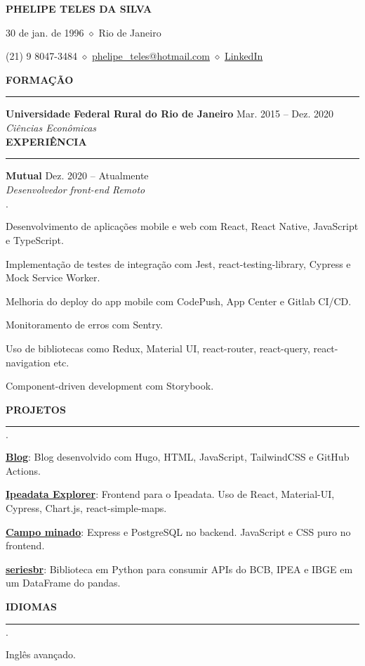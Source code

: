 \documentclass[11pt,letterpaper]{article}
\begin{document}
\centerline{\huge\bf PHELIPE TELES DA SILVA}
\medskip

\centerline{30 de jan. de 1996 $\diamond$ Rio de Janeiro}
\smallskip

\centerline{
  (21) 9 8047-3484 $\diamond$
  \href{mailto:phelipe_teles@hotmail.com}{phelipe\_teles@hotmail.com} $\diamond$ \href{https://linkedin.com/in/phelipeteles}{LinkedIn}
}
\smallskip

\medskip \textbf{FORMAÇÃO} \medskip
\hrule

\textbf{Universidade Federal Rural do Rio de Janeiro} \hfill {Mar. 2015 -- Dez. 2020} \\
\emph{Ciências Econômicas} \hfill \\

\medskip \textbf{EXPERIÊNCIA} \medskip
\hrule

\textbf{Mutual} \hfill Dez. 2020 -- Atualmente \\
\emph{Desenvolvedor front-end} \hfill \emph{Remoto} \\

\vspace*{-\baselineskip}

\begin{list}
{$\cdot$}
{
\setlength{\leftmargin}{0em}
\setlength{\itemsep}{-0.5em}
}
  \item Desenvolvimento de aplicações mobile e web com React, React Native,
    JavaScript e TypeScript.
  \item Implementação de testes de integração com Jest, react-testing-library,
    Cypress e Mock Service Worker.
  \item Melhoria do deploy do app mobile com CodePush, App Center e Gitlab CI/CD.
  \item Monitoramento de erros com Sentry.
  \item Uso de bibliotecas como Redux, Material UI, react-router, react-query,
    react-navigation etc.
  \item Component-driven development com Storybook.
\end{list}

\medskip \textbf{PROJETOS} \medskip
\hrule

\begin{list}
{$\cdot$}
{
\setlength{\leftmargin}{0em}
\setlength{\itemsep}{-0.5em}
}
 \item \href{https://phelipetls.github.io}{\textbf{Blog}}: Blog desenvolvido com
   Hugo, HTML, JavaScript, TailwindCSS e GitHub Actions.
 \item \href{http://ipeadata-explorer.surge.sh}{\textbf{Ipeadata Explorer}}:
   Frontend para o Ipeadata. Uso de React, Material-UI, Cypress, Chart.js,
   react-simple-maps.
 \item \href{https://github.com/phelipetls/minesweeper.js}{\textbf{Campo minado}}:
   Express e PostgreSQL no backend. JavaScript e CSS puro no frontend.
 \item \href{https://github.com/phelipetls/seriesbr}{\textbf{seriesbr}}:
   Biblioteca em Python para consumir APIs do BCB, IPEA e IBGE em um DataFrame
   do pandas.
\end{list}

\medskip \textbf{IDIOMAS} \medskip
\hrule

\begin{list}
{$\cdot$}
{
\setlength{\leftmargin}{0em}
\setlength{\itemsep}{-0.5em}
}
  \item Inglês avançado.
\end{list}
\end{document}
